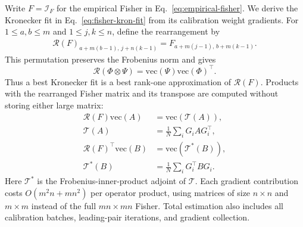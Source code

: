 Write $F=\mathcal I_F$ for the empirical Fisher in Eq.~\eqref{eq:empirical-fisher}. We derive the Kronecker fit in Eq.~\eqref{eq:fisher-kron-fit} from its calibration weight gradients.
For $1\le a,b\le m$ and $1\le j,k\le n$, define the rearrangement by
\begin{equation}
\begin{aligned}
\mathcal R(F)_{a+m(b-1),\,j+n(k-1)}
=F_{a+m(j-1),\,b+m(k-1)}.
\end{aligned}
\end{equation}
This permutation preserves the Frobenius norm and gives
\begin{equation}
\mathcal R(\Phi\otimes\Psi)
=\mathrm{vec}(\Psi)\mathrm{vec}(\Phi)^\top.
\end{equation}
Thus a best Kronecker fit is a best rank-one approximation of $\mathcal R(F)$. Products with the rearranged Fisher matrix and its transpose are computed without storing either large matrix:
\begin{equation}
\begin{aligned}
\mathcal R(F)\mathrm{vec}(A)&=\mathrm{vec}(\mathcal T(A)),\\
\mathcal T(A)&=\frac1N\sum_iG_iAG_i^\top,\\
\mathcal R(F)^\top\mathrm{vec}(B)&=\mathrm{vec}(\mathcal T^*(B)),\\
\mathcal T^*(B)&=\frac1N\sum_iG_i^\top BG_i.
\end{aligned}
\label{eq:sup-fisher-operators}
\end{equation}
Here $\mathcal T^*$ is the Frobenius-inner-product adjoint of $\mathcal T$. Each gradient contribution costs $O(m^2n+mn^2)$ per operator product, using matrices of size $n\times n$ and $m\times m$ instead of the full $mn\times mn$ Fisher. Total estimation also includes all calibration batches, leading-pair iterations, and gradient collection.

